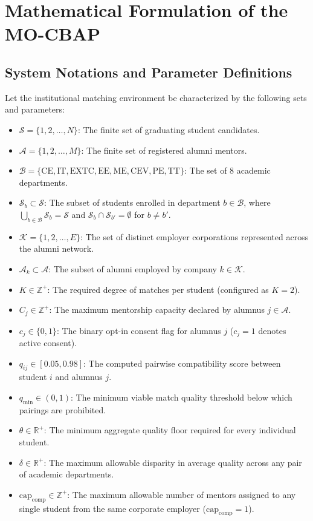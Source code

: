 \chapter{Mathematical Formulation of the MO-CBAP}
\label{ch:formulation}

\section{System Notations and Parameter Definitions}
Let the institutional matching environment be characterized by the following sets and parameters:
\begin{itemize}
    \item $\mathcal{S} = \{1, 2, \dots, N\}$: The finite set of graduating student candidates.
    \item $\mathcal{A} = \{1, 2, \dots, M\}$: The finite set of registered alumni mentors.
    \item $\mathcal{B} = \{\text{CE}, \text{IT}, \text{EXTC}, \text{EE}, \text{ME}, \text{CEV}, \text{PE}, \text{TT}\}$: The set of 8 academic departments.
    \item $\mathcal{S}_b \subset \mathcal{S}$: The subset of students enrolled in department $b \in \mathcal{B}$, where $\bigcup_{b \in \mathcal{B}} \mathcal{S}_b = \mathcal{S}$ and $\mathcal{S}_b \cap \mathcal{S}_{b'} = \emptyset$ for $b \ne b'$.
    \item $\mathcal{K} = \{1, 2, \dots, E\}$: The set of distinct employer corporations represented across the alumni network.
    \item $\mathcal{A}_k \subset \mathcal{A}$: The subset of alumni employed by company $k \in \mathcal{K}$.
    \item $K \in \mathbb{Z}^+$: The required degree of matches per student (configured as $K = 2$).
    \item $C_j \in \mathbb{Z}^+$: The maximum mentorship capacity declared by alumnus $j \in \mathcal{A}$.
    \item $c_j \in \{0, 1\}$: The binary opt-in consent flag for alumnus $j$ ($c_j = 1$ denotes active consent).
    \item $q_{ij} \in [0.05, 0.98]$: The computed pairwise compatibility score between student $i$ and alumnus $j$.
    \item $q_{\min} \in (0, 1)$: The minimum viable match quality threshold below which pairings are prohibited.
    \item $\theta \in \mathbb{R}^+$: The minimum aggregate quality floor required for every individual student.
    \item $\delta \in \mathbb{R}^+$: The maximum allowable disparity in average quality across any pair of academic departments.
    \item $\text{cap}_{\text{comp}} \in \mathbb{Z}^+$: The maximum allowable number of mentors assigned to any single student from the same corporate employer ($\text{cap}_{\text{comp}} = 1$).
\end{itemize}

